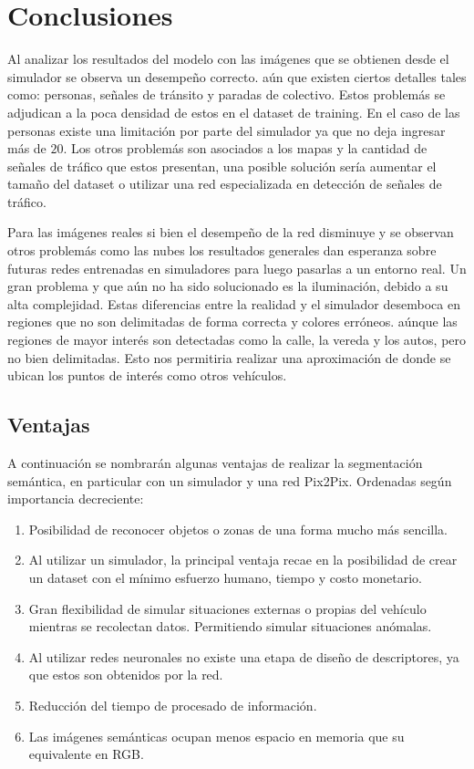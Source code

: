 \documentclass[]{IEEEtran}
\begin{document}
    \section{Conclusiones}
    
    Al analizar los resultados del modelo con las imágenes que se obtienen desde el simulador se observa un desempeño correcto. aún que 
    existen ciertos detalles tales como: personas, señales de tránsito y paradas de colectivo. Estos problemás se adjudican a la poca 
    densidad de estos en el dataset de training. En el caso de las personas existe una limitación por parte del simulador ya que no 
    deja ingresar más de $20$. Los otros problemás son asociados a los mapas y la cantidad de señales de tráfico que estos presentan, una 
    posible solución sería aumentar el tamaño del dataset o utilizar una red especializada en detección de señales de tráfico.

    Para las imágenes reales si bien el desempeño de la red disminuye y se observan otros problemás como las nubes los resultados generales 
    dan esperanza sobre futuras redes entrenadas en simuladores para luego pasarlas a un entorno real. Un gran problema y que aún no 
    ha sido solucionado es la iluminación, debido a su alta complejidad. Estas diferencias entre la realidad y el simulador desemboca 
    en regiones que no son delimitadas de forma correcta y colores erróneos. aúnque las regiones de mayor interés son detectadas como 
    la calle, la vereda y los autos, pero no bien delimitadas. Esto nos permitiria realizar una aproximación de donde se ubican los puntos 
    de interés como otros vehículos.


    \subsection{Ventajas}

    A continuación se nombrarán algunas ventajas de realizar la segmentación semántica, en particular con un simulador y una red Pix2Pix. 
    Ordenadas según importancia decreciente:
    
    \begin{enumerate}
        \item Posibilidad de reconocer objetos o zonas de una forma
        mucho más sencilla. 
        \item Al utilizar un simulador, la principal ventaja recae en la posibilidad de crear un dataset con el mínimo esfuerzo humano, tiempo y costo monetario.
        \item Gran flexibilidad de simular situaciones externas o propias del
        vehículo mientras se recolectan datos. Permitiendo simular situaciones anómalas.
        \item Al utilizar redes neuronales no existe una etapa de diseño de descriptores, ya que estos son obtenidos por la red.
        \item Reducción del tiempo de procesado de información.
        \item Las imágenes semánticas ocupan menos espacio en memoria que su equivalente en RGB.
    \end{enumerate}
    
\end{document}
